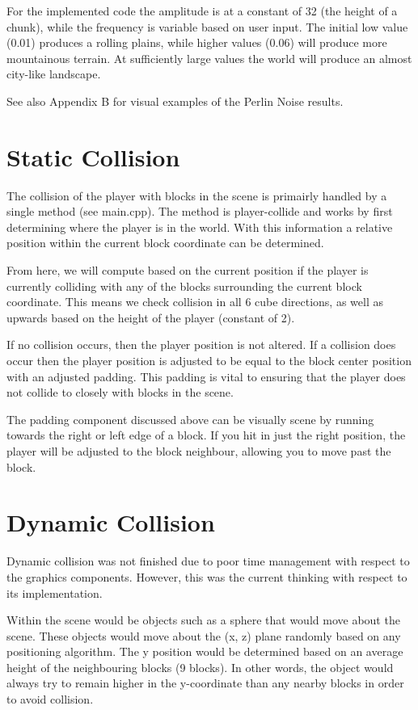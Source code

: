 \documentclass{book}
\begin{document}
For the implemented code the amplitude is at a constant of 32 (the height of a chunk), while the frequency is variable based on user input.  The initial low value (0.01) produces a rolling plains, while higher values (0.06) will produce more mountainous terrain.  At sufficiently large values the world will produce an almost city-like landscape.
    
See also Appendix B for visual examples of the Perlin Noise results.
    
\section{Static Collision}
    
The collision of the player with blocks in the scene is primairly handled by a single method (see main.cpp).  The method is player-collide and works by first determining where the player is in the world.  With this information a relative position within the current block coordinate can be determined.  
    
From here, we will compute based on the current position if the player is currently colliding with any of the blocks surrounding the current block coordinate.  This means we check collision in all 6 cube directions, as well as upwards based on the height of the player (constant of 2).
    
If no collision occurs, then the player position is not altered.  If a collision does occur then the player position is adjusted to be equal to the block center position with an adjusted padding.  This padding is vital to ensuring that the player does not collide to closely with blocks in the scene.
    
The padding component discussed above can be visually scene by running towards the right or left edge of a block.  If you hit in just the right position, the player will be adjusted to the block neighbour, allowing you to move past the block.
    
\section{Dynamic Collision}
    
Dynamic collision was not finished due to poor time management with respect to the graphics components.  However, this was the current thinking with respect to its implementation.
    
Within the scene would be objects such as a sphere that would move about the scene.  These objects would move about the (x, z) plane randomly based on any positioning algorithm.  The y position would be determined based on an average height of the neighbouring blocks (9 blocks).  In other words, the object would always try to remain higher in the y-coordinate than any nearby blocks in order to avoid collision.
    
\end{document}
